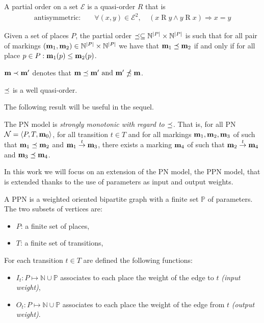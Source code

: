 \begin{defi}
  A partial order on a set $\mathcal{E}$ is a quasi-order $R$ that is
  \begin{align*}
    \text{antisymmetric: } &&\forall (x, y) \in \mathcal{E}^2,\ & (x \mathrel{R} y\land y \mathrel{R} x)\Rightarrow x = y
  \end{align*}
\end{defi}

\begin{defi}
  Given a set of places $P$, the partial order \(\preceq \subseteq \mathbb{N}^{|P|} \times \mathbb{N}^{|P|}\) is such that for all pair of markings \((\mathbf{m}_1, \mathbf{m}_2) \in \mathbb{N}^{|P|} \times \mathbb{N}^{|P|}\) we have that \(\mathbf{m}_1 \preceq \mathbf{m}_2\) if and only if for all place \(p \in P : \mathbf{m}_1(p) \leq \mathbf{m}_2(p)\).
\end{defi}

\(\mathbf{m} \prec \mathbf{m'}\) denotes that \(\mathbf{m} \preceq \mathbf{m'} \text{ and } \mathbf{m'} \npreceq \mathbf{m}\).

\begin{lemm}
  \label{lemm:wqo}
  $\preceq$ is a well quasi-order.
\end{lemm}

The following result will be useful in the sequel.

\begin{lemm}
  The \ac{PN} model is \emph{strongly monotonic with regard to $\preceq$}. That is, for all \ac{PN} $\mathcal{N} = \langle P,T, \mathbf{m}_0\rangle$, for all transition $t \in T$ and for all markings $\mathbf{m}_1, \mathbf{m}_2, \mathbf{m}_3$ of \tupleN such that $\mathbf{m}_1 \preceq \mathbf{m}_2$ and $\mathbf{m}_1 \stackrel{t}{\to} \mathbf{m}_3$, there exists a marking $\mathbf{m}_4$ of \tupleN such that $\mathbf{m}_2 \stackrel{t}{\to} \mathbf{m}_4$ and $\mathbf{m}_3 \preceq \mathbf{m}_4$. 
\end{lemm}

In this work we will focus on an extension of the \ac{PN} model, the \ac{PPN} model, that is extended thanks to the use of parameters as input and output weights.

\begin{defi}
  A \acf{PPN} \SPTP is a weighted oriented bipartite graph with a finite set $\mathbb{P}$ of parameters. The two subsets of vertices are:
  \begin{itemize}
    \item $P$: a finite set of places,
    \item $T$: a finite set of transitions,
  \end{itemize}
  For each transition $t \in T$ are defined the following functions:
  \begin{itemize}
    \item $I_t : P \mapsto \mathbb{N} \cup \mathbb{P}$ associates to each place the weight of the edge to $t$ \emph{(input weight)},
    \item $O_t : P \mapsto \mathbb{N} \cup \mathbb{P}$ associates to each place the weight of the edge from $t$ \emph{(output weight)}.
  \end{itemize}
\end{defi}

